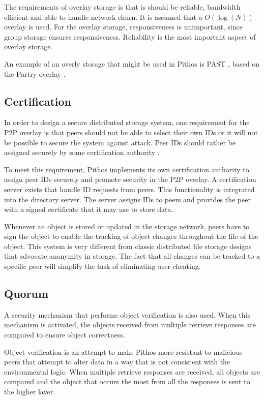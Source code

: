 The requirements of overlay storage is that is should be reliable, bandwidth efficient and able to handle network churn. It is assumed that a $O(\log(N))$ overlay is used. For the overlay storage, responsiveness is unimportant, since group storage ensures responsiveness. Reliability is the most important aspect of overlay storage.

An example of an overly storage that might be used in Pithos is PAST \cite{PAST_storage}, based on the Partry overlay \cite{pastry}.

\subsection{Certification}

In order to design a secure distributed storage system, one requirement for the P2P overlay is that peers should not be able to select their own IDs or it will not be possible to secure the system against attack. Peer IDs should rather be assigned securely by some certification authority \cite{secure_overlay_routing}.

To meet this requirement, Pithos implements its own certification authority to assign peer IDs securely and promote security in the P2P overlay. A certification server exists that handle ID requests from peers. This functionality is integrated into the directory server. The server assigns IDs to peers and provides the peer with a signed certificate that it may use to store data.

Whenever an object is stored or updated in the storage network, peers have to sign the object to enable the tracking of object changes throughout the life of the object. This system is very different from classic distributed file storage designs that advocate anonymity in storage. The fact that all changes can be tracked to a specific peer will simplify the task of eliminating user cheating.

\subsection{Quorum}
\label{quorum}

A security mechanism that performs object verification is also used. When this mechanism is activated, the objects received from multiple retrieve responses are compared to ensure object correctness.

Object verification is an attempt to make Pithos more resistant to malicious peers that attempt to alter data in a way that is not consistent with the environmental logic. When multiple retrieve responses are received, all objects are compared and the object that occurs the most from all the responses is sent to the higher layer.

